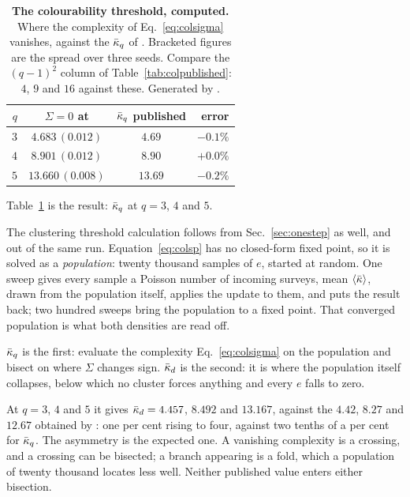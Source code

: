 \begin{table}[t]
\centering\small
\begin{tabular}{rccr}
\hline\hline
$q$ & $\Sigma=0$ at & $\bar\kappa_{q}$ published & error\\
\hline
$3$ & $4.683\,(0.012)$ & $4.69$ & $-0.1\%$\\
$4$ & $8.901\,(0.012)$ & $8.90$ & $+0.0\%$\\
$5$ & $13.660\,(0.008)$ & $13.69$ & $-0.2\%$\\
\hline\hline
\end{tabular}
\caption{\textbf{The colourability threshold, computed.} Where the complexity of
Eq.~\eqref{eq:colsigma} vanishes, against the $\bar\kappa_{q}$ of \citet{mulet2002}. Bracketed figures are the spread over three seeds. Compare
the $(q-1)^{2}$ column of Table~\ref{tab:colpublished}: $4$, $9$ and $16$ against
these. Generated by .}
\label{tab:colsp}
\end{table}

Table~\ref{tab:colsp} is the result: $\bar\kappa_{q}$ at $q=3$, $4$ and $5$.

The clustering threshold calculation follows from Sec.~\ref{sec:onestep} as
well, and out of the same run. Equation~\eqref{eq:colsp} has no closed-form
fixed point, so it is solved as a \emph{population}: twenty thousand samples of
$e$, started at random. One sweep gives every sample a Poisson number of
incoming surveys, mean $\langle \bar\kappa \rangle$, drawn from the population itself, applies
the update to them, and puts the result back; two hundred sweeps bring the
population to a fixed point. That converged population is what both densities
are read off.

$\bar\kappa_{q}$ is the first: evaluate the complexity Eq.~\eqref{eq:colsigma} on
the population and bisect on where $\Sigma$ changes sign. $\bar\kappa_{d}$ is the
second: it is where the population itself collapses, below which no cluster
forces anything and every $e$ falls to zero.

At $q=3$, $4$ and $5$ it gives $\bar\kappa_{d}=4.457$, $8.492$ and $13.167$,
against the $4.42$, $8.27$ and $12.67$ obtained by \citet{mulet2002}: one per
cent rising to four, against two tenths of a per cent for $\bar\kappa_{q}$. The
asymmetry is the expected one. A vanishing complexity is a crossing, and a
crossing can be bisected; a branch appearing is a fold, which a population of
twenty thousand locates less well. Neither published value enters either
bisection.

